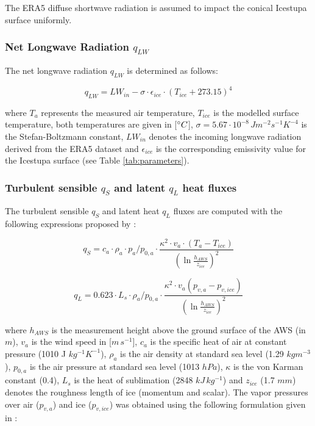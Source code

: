 \documentclass[utf8]{frontiersSCNS} %
\begin{document}
The ERA5 diffuse shortwave radiation is assumed to impact the conical Icestupa surface uniformly. 

\subsubsection{Net Longwave Radiation \texorpdfstring{$q_{LW}$}{Lg}}

The net longwave radiation $q_{LW}$ is determined as follows:

\begin{equation} q_{LW}= LW_{in}-\sigma \cdot \epsilon_{ice} \cdot {(T_{ice}+ 273.15)}^4
\label{eqn:LW} \end{equation}

where $T_a$ represents the measured air temperature, $T_{ice}$ is the modelled surface temperature, both temperatures
are given in [$\degree C$], $\sigma=5.67\cdot 10^{-8}\,Jm^{-2}s^{-1}K^{-4}$ is the Stefan-Boltzmann constant, $LW_{in}$
denotes the incoming longwave radiation derived from the ERA5 dataset and $\epsilon_{ice}$ is the corresponding
emissivity value for the Icestupa surface (see Table \ref{tab:parameters}).

\subsubsection{Turbulent sensible \texorpdfstring{$q_{S}$}{Lg} and latent \texorpdfstring{$q_{L}$}{Lg} heat fluxes }

The turbulent sensible $q_{S}$ and latent heat $q_{L}$ fluxes are computed with the following expressions proposed by
\cite{Garratt_1992}:

\begin{equation} q_{S}=c_{a} \cdot \rho_{a} \cdot p_{a}/p_{0,a} \cdot \frac{\kappa^2 \cdot v_a \cdot
(T_a-T_{ice})}{{(\ln{\frac{h_{AWS}}{z_{ice}}})}^2} \label{eqn:qs} \end{equation}

\begin{equation} q_{L}=0.623 \cdot L_s \cdot \rho_{a}/p_{0,a} \cdot \frac{\kappa^2 \cdot
v_a(p_{v,a}-p_{v,ice})}{{(\ln{\frac{h_{AWS}}{z_{ice}}})}^2} \end{equation}

where $h_{AWS}$ is the measurement height above the ground surface of the AWS (in $m$), $v_a$ is the wind speed in
[$m\,s^{-1}$], $c_a$ is the specific heat of air at constant pressure (1010 J $kg^{-1} K^{-1}$), $\rho_{a}$ is the air
density at standard sea level (1.29 $kg m^{-3}$), $p_{0,a}$ is the air pressure at standard sea level (1013 $hPa$),
$\kappa$ is the von Karman constant (0.4), $L_s$ is the heat of sublimation (2848 $kJ\, kg^{-1}$) and $z_{ice}$ (1.7
$mm$) denotes the roughness length of ice (momentum and scalar).  The vapor pressures over air ($p_{v,a}$) and ice
($p_{v,ice}$) was obtained using the following formulation given in \cite{WMO_2018}:
\end{document}
